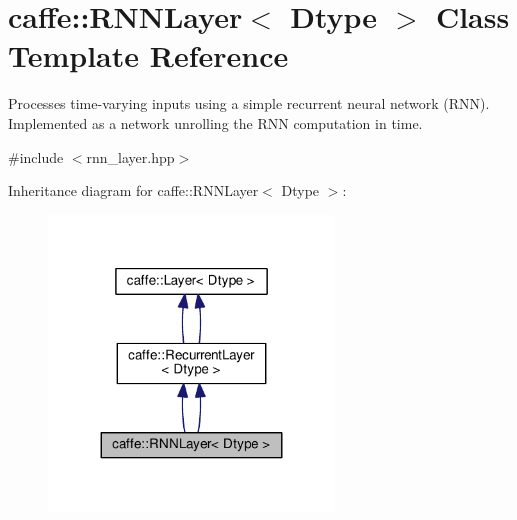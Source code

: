 \hypertarget{classcaffe_1_1_r_n_n_layer}{}\section{caffe\+:\+:R\+N\+N\+Layer$<$ Dtype $>$ Class Template Reference}
\label{classcaffe_1_1_r_n_n_layer}


Processes time-\/varying inputs using a simple recurrent neural network (R\+NN). Implemented as a network unrolling the R\+NN computation in time.  




{\ttfamily \#include $<$rnn\+\_\+layer.\+hpp$>$}



Inheritance diagram for caffe\+:\+:R\+N\+N\+Layer$<$ Dtype $>$\+:
\nopagebreak
\begin{figure}[H]
\begin{center}
\leavevmode
\includegraphics[width=215pt]{classcaffe_1_1_r_n_n_layer__inherit__graph}
\end{center}
\end{figure}
